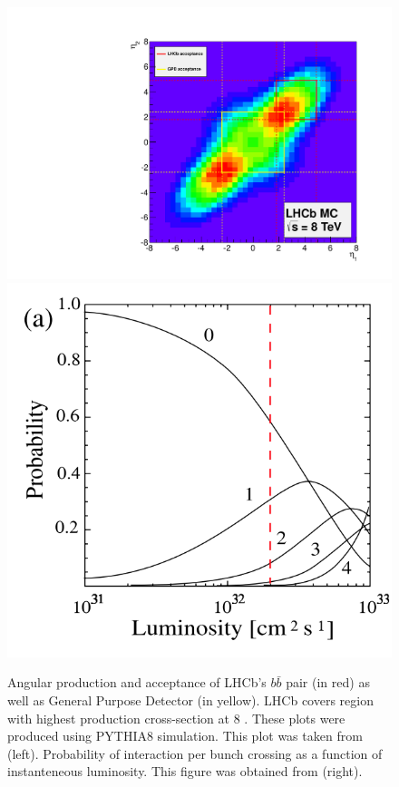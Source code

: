 \begin{figure}
	\centering
	\includegraphics[scale = 0.4]{figs/detector/Acceptance.pdf}%
	\includegraphics[scale = 0.5]{figs/detector/ProbInt.png}
	\caption{Angular production and acceptance of LHCb's $b\bar{b}$ pair (in red) as well as General Purpose Detector (in yellow). \Gls{LHCb} covers region with highest production cross-section at 8 \tev. These plots were produced using PYTHIA8 \cite{pythia8} simulation. This plot was taken from \cite{acceptance} (left). Probability of interaction per bunch crossing as a function of instanteneous luminosity. This figure was obtained from \cite{Raven:2007zi} (right).}
	\label{fig:Acceptance}
\end{figure}

